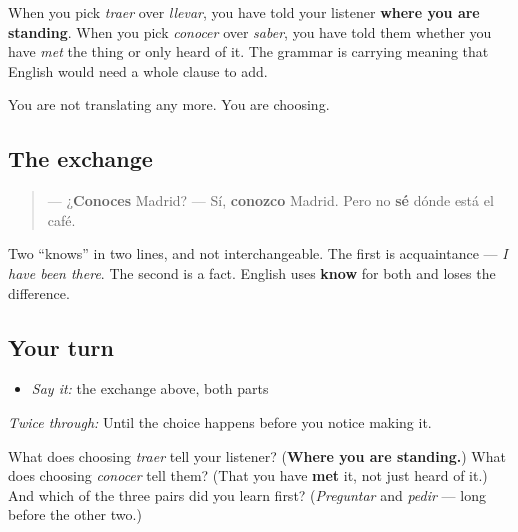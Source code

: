 \begin{grammarlens}[title={What you've built}]
When you pick \emph{traer} over \emph{llevar}, you have told your listener \textbf{where you are standing}. When you pick \emph{conocer} over \emph{saber}, you have told them whether you have \emph{met} the thing or only heard of it. The grammar is carrying meaning that English would need a whole clause to add.

You are not translating any more. You are choosing.
\end{grammarlens}

\subsection*{The exchange}
\begin{quote}
— ¿\textbf{Conoces} Madrid? — Sí, \textbf{conozco} Madrid. Pero no \textbf{sé} dónde está el café.
\end{quote}

Two \textquotedblleft{}knows\textquotedblright{} in two lines, and not interchangeable. The first is acquaintance — \emph{I have been there}. The second is a fact. English uses \textbf{know} for both and loses the difference.

\subsection*{Your turn}
\begin{itemize}
\raggedright
  \item \emph{Say it:} the exchange above, both parts
\end{itemize}

\emph{Twice through:} Until the choice happens before you notice making it.

\begin{tcolorbox}[breakable,colback=teal!4,colframe=teal!35!black,title={Before you move on}]
What does choosing \emph{traer} tell your listener? (\textbf{Where you are standing.}) What does choosing \emph{conocer} tell them? (That you have \textbf{met} it, not just heard of it.) And which of the three pairs did you learn first? (\emph{Preguntar} and \emph{pedir} — long before the other two.)
\end{tcolorbox}
